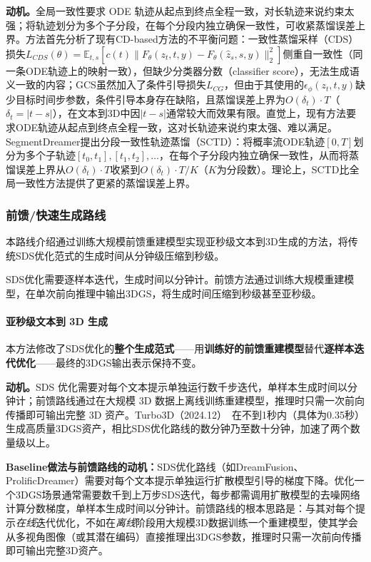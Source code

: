 \textbf{动机。}全局一致性要求 ODE 轨迹从起点到终点全程一致，对长轨迹来说约束太强；将轨迹划分为多个子分段，在每个分段内独立确保一致性，可收紧蒸馏误差上界。方法首先分析了现有CD-based方法的不平衡问题：一致性蒸馏采样（CDS）损失$L_{CDS}(\theta) = \mathbb{E}_{t,s}[c(t)\|F_\theta(z_t,t,y) - F_\theta(\hat{z}_s,s,y)\|_2^2]$侧重自一致性（同一条ODE轨迹上的映射一致），但缺少分类器分数（classifier score），无法生成语义一致的内容；GCS虽然加入了条件引导损失$L_{CG}$，但由于其使用的$\epsilon_\phi(z_t,t,y)$缺少目标时间步参数，条件引导本身存在缺陷，且蒸馏误差上界为$O(\delta_t) \cdot T$（$\delta_t = |t-s|$），在文本到3D中因$|t-s|$通常较大而效果有限。直觉上，现有方法要求ODE轨迹从起点到终点全程一致，这对长轨迹来说约束太强、难以满足。SegmentDreamer提出分段一致性轨迹蒸馏（SCTD）：将概率流ODE轨迹$[0,T]$划分为多个子轨迹$[t_0, t_1], [t_1, t_2], \ldots$，在每个子分段内独立确保一致性，从而将蒸馏误差上界从$O(\delta_t) \cdot T$收紧到$O(\delta_t) \cdot T/K$（$K$为分段数）。理论上，SCTD比全局一致性方法提供了更紧的蒸馏误差上界。

\subsubsection{前馈/快速生成路线}

本路线介绍通过训练大规模前馈重建模型实现亚秒级文本到3D生成的方法，将传统SDS优化范式的生成时间从分钟级压缩到秒级。

SDS优化需要逐样本迭代，生成时间以分钟计。前馈方法通过训练大规模重建模型，在单次前向推理中输出3DGS，将生成时间压缩到秒级甚至亚秒级。

\paragraph{亚秒级文本到 3D 生成}

本方法修改了SDS优化的\textbf{整个生成范式}——用\textbf{训练好的前馈重建模型}替代\textbf{逐样本迭代优化}——最终的3DGS输出表示保持不变。

\textbf{动机。}SDS 优化需要对每个文本提示单独运行数千步迭代，单样本生成时间以分钟计；前馈路线通过在大规模 3D 数据上离线训练重建模型，推理时只需一次前向传播即可输出完整 3D 资产。Turbo3D（2024.12）~\cite{2412_04470}在不到1秒内（具体为0.35秒）生成高质量3DGS资产，相比SDS优化路线的数分钟乃至数十分钟，加速了两个数量级以上。

\textbf{Baseline做法与前馈路线的动机：}SDS优化路线（如DreamFusion、ProlificDreamer）需要对每个文本提示单独运行扩散模型引导的梯度下降。优化一个3DGS场景通常需要数千到上万步SDS迭代，每步都需调用扩散模型的去噪网络计算分数梯度，单样本生成时间以分钟计。前馈路线的根本思路是：与其对每个提示\textit{在线}迭代优化，不如在\textit{离线}阶段用大规模3D数据训练一个重建模型，使其学会从多视角图像（或其潜在编码）直接推理出3DGS参数，推理时只需一次前向传播即可输出完整3D资产。

